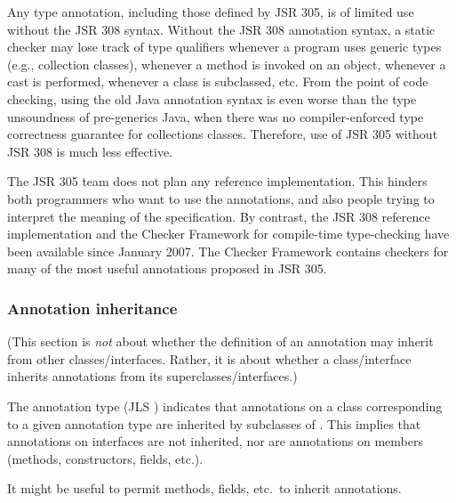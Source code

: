 \documentclass[10pt]{article}
\begin{document}
Any type annotation, including those defined by JSR 305, is of limited use
without the JSR 308 syntax.  Without the JSR 308 annotation syntax, a
static checker may lose track of type qualifiers whenever a program uses
generic types (e.g., collection classes), whenever a method is invoked on
an object, whenever a cast is performed, whenever a class is subclassed,
etc.  From the point of code checking, using the old Java annotation syntax
is even worse than the type unsoundness of pre-generics Java, when there
was no compiler-enforced type correctness guarantee for collections
classes.  Therefore, use of JSR 305 without JSR 308 is much less effective.

The JSR 305 team does not plan any reference implementation.
This hinders both programmers who want to use the annotations,
and also people trying to interpret the meaning of the specification.  By
contrast, the JSR 308 reference implementation and the Checker Framework
for compile-time type-checking have been available since January 2007.
The Checker Framework contains checkers for many of the most useful
annotations proposed in JSR 305.






\subsubsection{Annotation inheritance\label{annotation-inheritance}}

(This section is \emph{not} about whether the definition of an annotation
may inherit from other classes/interfaces.  Rather, it is about whether a
class/interface inherits annotations from its superclasses/interfaces.)

The annotation type
(JLS )
indicates that annotations on a class  corresponding to a given
annotation type are inherited by subclasses of \@.  This implies
that annotations on interfaces are not inherited, nor are annotations on
members (methods, constructors, fields, etc.).

It might be useful to permit methods, fields, etc.\ to inherit annotations.
\end{document}
